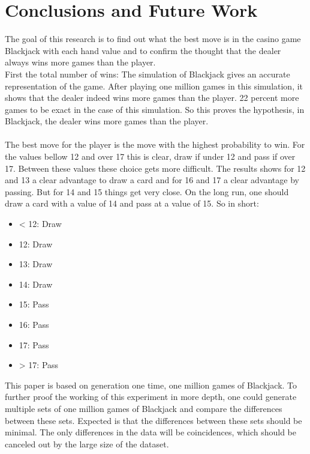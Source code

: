 \section{Conclusions and Future Work}
The goal of this research is to find out what the best move is in the casino game Blackjack with each hand value and to confirm the thought that the dealer always wins more games than the player. \\
First the total number of wins: The simulation of Blackjack gives an accurate representation of the game. After playing one million games in this simulation, it shows that the dealer indeed wins more games than the player. 22 percent more games to be exact in the case of this simulation. So this proves the hypothesis, in Blackjack, the dealer wins more games than the player. \\
\\
The best move for the player is the move with the highest probability to win. For the values bellow 12 and over 17 this is clear, draw if under 12 and pass if over 17. Between these values these choice gets more difficult. The results shows for 12 and 13 a clear advantage to draw a card and for 16 and 17 a clear advantage by passing. But for 14 and 15 things get very close. On the long run, one should draw a card with a value of 14 and pass at a value of 15. So in short:
\begin{itemize}
    \item < 12: Draw
    \item 12: Draw
    \item 13: Draw
    \item 14: Draw
    \item 15: Pass
    \item 16: Pass
    \item 17: Pass
    \item > 17: Pass
\end{itemize}
This paper is based on generation one time, one million games of Blackjack. To further proof the working of this experiment in more depth, one could generate multiple sets of one million games of Blackjack and compare the differences between these sets. Expected is that the differences between these sets should be minimal. The only differences in the data will be coincidences, which should be canceled out by the large size of the dataset.

